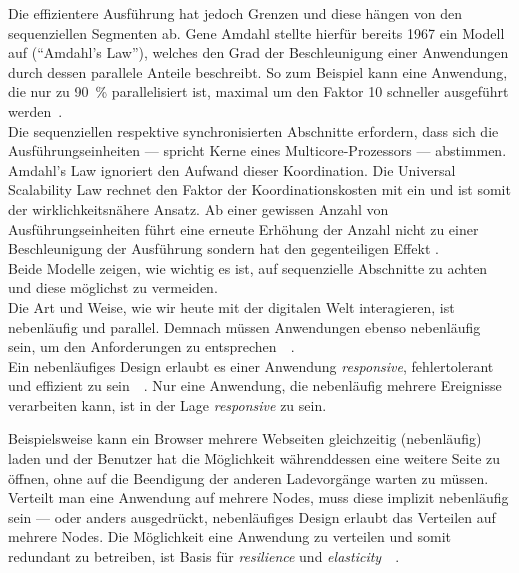 Die effizientere Ausführung hat jedoch Grenzen und diese hängen von den sequenziellen Segmenten ab. Gene Amdahl stellte hierfür bereits 1967 ein Modell auf (\enquote{Amdahl's Law}), welches den Grad der Beschleunigung einer Anwendungen durch dessen parallele Anteile beschreibt. So zum Beispiel kann eine Anwendung, die nur zu 90~\% parallelisiert ist, maximal um den Faktor 10 schneller ausgeführt werden~\cite{amdahl_validity_1967}.\\
Die sequenziellen respektive synchronisierten Abschnitte erfordern, dass sich die Ausführungseinheiten --- spricht Kerne eines Multicore-Prozessors --- abstimmen. Amdahl's Law ignoriert den Aufwand dieser Koordination. Die Universal Scalability Law rechnet den Faktor der Koordinationskosten mit ein und ist somit der wirklichkeitsnähere Ansatz. Ab einer gewissen Anzahl von Ausführungseinheiten führt eine erneute Erhöhung der Anzahl nicht zu einer Beschleunigung der Ausführung sondern hat den gegenteiligen Effekt \cite[S.~46]{kuhn_reactive_2015}.\\
Beide Modelle zeigen, wie wichtig es ist, auf sequenzielle Abschnitte zu achten und diese möglichst zu vermeiden.\\

Die Art und Weise, wie wir heute mit der digitalen Welt interagieren, ist nebenläufig und parallel. Demnach müssen Anwendungen ebenso nebenläufig sein, um den Anforderungen zu entsprechen~\cite[S.~5]{butcher_seven_2014}~\cite[S.~3~\&~S.~178]{armstrong_programming_2013}.\\
Ein nebenläufiges Design erlaubt es einer Anwendung \textit{responsive}, fehlertolerant und effizient zu sein~\cite[S.~4~\&~S.~6]{butcher_seven_2014}~\cite[S.~6]{armstrong_programming_2013}. Nur eine Anwendung, die nebenläufig mehrere Ereignisse verarbeiten kann, ist in der Lage \textit{responsive} zu sein.

\pagebreak

 Beispielsweise kann ein Browser mehrere Webseiten gleichzeitig (nebenläufig) laden und der Benutzer hat die Möglichkeit währenddessen eine weitere Seite zu öffnen, ohne auf die Beendigung der anderen Ladevorgänge warten zu müssen. Verteilt man eine Anwendung auf mehrere Nodes, muss diese implizit nebenläufig sein --- oder anders ausgedrückt, nebenläufiges Design erlaubt das Verteilen auf mehrere Nodes. Die Möglichkeit eine Anwendung zu verteilen und somit redundant zu betreiben, ist Basis für \textit{resilience} und \textit{elasticity}~\cite[S.~6]{butcher_seven_2014}~\cite[S.~6~\&~S.~7]{armstrong_programming_2013}.\\

